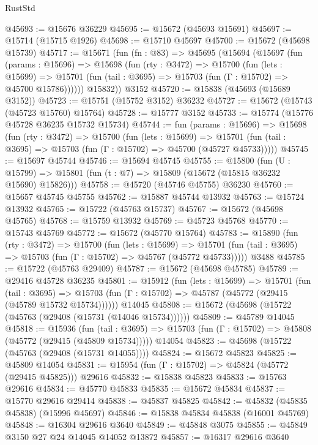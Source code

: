 \begin{lexlean}{RustStd}
\begin{coremodule}
@45693 := @15676 @36229
@45695 := @15672 (@45693 @15691)
@45697 := @15714 (@15715 @1926)
@45698 := @15710 @45697
@45700 := @15672 (@45698 @15739)
@45717 := @15671
    (fun (fn : @83) =>
    @45695
      (@15694
        (@15697
          (fun (params : @15696) =>
          @15698
            (fun (rty : @3472) =>
            @15700
              (fun (lets : @15699) =>
              @15701 (fun (tail : @3695) => @15703 (fun (Γ : @15702) => @45700 @15786))))))
        @15832))
    @3152
@45720 := @15838 (@45693 (@15689 @3152))
@45723 := @15751 (@15752 @3152) @36232
@45727 := @15672 (@15743 (@45723 @15760) @15764)
@45728 := @15777 @3152
@45733 := @15774 (@15776 @45728 @36235 @15732 @15734)
@45744 := fun (params : @15696) =>
  @15698
    (fun (rty : @3472) =>
    @15700
      (fun (lets : @15699) =>
      @15701 (fun (tail : @3695) => @15703 (fun (Γ : @15702) => @45700 (@45727 @45733)))))
@45745 := @15697 @45744
@45746 := @15694 @45745
@45755 := @15800
    (fun (U : @15799) => @15801 (fun (t : @7) => @15809 (@15672 (@15815 @36232 @15690) @15826)))
@45758 := @45720 (@45746 @45755) @36230
@45760 := @15657 @45745 @45755
@45762 := @15887 @45744 @13932
@45763 := @15724 @13932
@45765 := @15722 (@45763 @15737)
@45767 := @15672 (@45698 @45765)
@45768 := @15759 @13932
@45769 := @45723 @45768
@45770 := @15743 @45769
@45772 := @15672 (@45770 @15764)
@45783 := @15890
    (fun (rty : @3472) =>
    @15700
      (fun (lets : @15699) =>
      @15701 (fun (tail : @3695) => @15703 (fun (Γ : @15702) => @45767 (@45772 @45733)))))
    @3488
@45785 := @15722 (@45763 @29409)
@45787 := @15672 (@45698 @45785)
@45789 := @29416 @45728 @36235
@45801 := @15912
    (fun (lets : @15699) =>
    @15701
      (fun (tail : @3695) =>
      @15703 (fun (Γ : @15702) => @45787 (@45772 (@29415 (@45789 @15732 @15734))))))
    @14045
@45808 := @15672 (@45698 (@15722 (@45763 (@29408 (@15731 (@14046 @15734))))))
@45809 := @45789 @14045
@45818 := @15936
    (fun (tail : @3695) => @15703 (fun (Γ : @15702) => @45808 (@45772 (@29415 (@45809 @15734)))))
    @14054
@45823 := @45698 (@15722 (@45763 (@29408 (@15731 @14055))))
@45824 := @15672 @45823
@45825 := @45809 @14054
@45831 := @15954 (fun (Γ : @15702) => @45824 (@45772 (@29415 @45825))) @29616
@45832 := @15838 @45823
@45833 := @15763 @29616
@45834 := @45770 @45833
@45835 := @15672 @45834
@45837 := @15770 @29616 @29414
@45838 := @45837 @45825
@45842 := @45832 (@45835 @45838) (@15996 @45697)
@45846 := @15838 @45834 @45838 (@16001 @45769)
@45848 := @16304 @29616 @3640
@45849 := @45848 @3075
@45855 := @45849 @3150 @27 @24 @14045 @14052 @13872
@45857 := @16317 @29616 @3640

\end{coremodule}
\end{lexlean}
